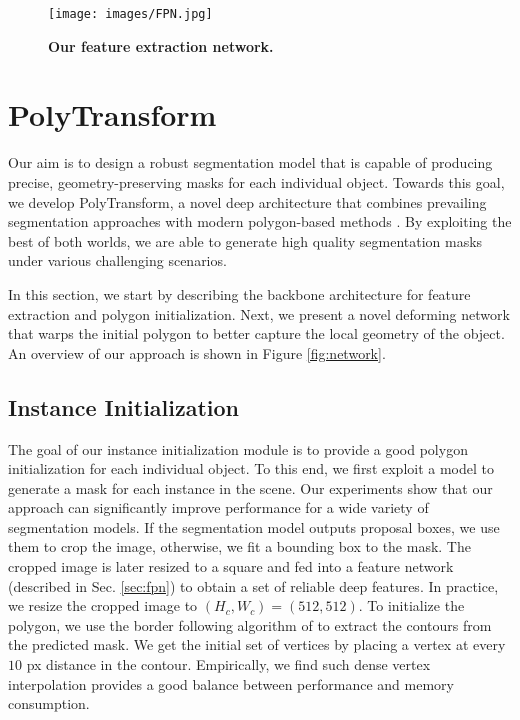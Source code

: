 \documentclass[10pt,twocolumn,letterpaper]{article}
\begin{document}
 



\begin{figure}[tb!]
\texttt{[image: images/FPN.jpg]}
\caption{\textbf{Our feature extraction network.}}
\vspace{-4mm}
\label{fig:fpn}
\end{figure}


\section{PolyTransform}
Our aim is to design a robust segmentation model that is capable of producing precise, geometry-preserving masks for each individual object. 
Towards this goal, we develop PolyTransform, a novel deep architecture that combines prevailing segmentation approaches \cite{mask-rcnn,upsnet} with modern polygon-based methods \cite{polygon-rnn,polygon-rnn++}. By exploiting the best of both worlds, we are able to generate high quality segmentation masks under various challenging scenarios.


In this section, we start by describing the backbone architecture for feature extraction and polygon initialization. 
Next, we present a novel deforming network that warps the initial polygon to better capture the local geometry of the object. An overview of our approach is shown in Figure \ref{fig:network}.






\subsection{Instance Initialization}
The goal of our instance initialization module is to provide a good polygon initialization for each individual object. To this end, we first exploit a  model to generate a mask for each instance in the scene. Our experiments show that our approach can significantly improve performance for a wide variety of segmentation models.  If the segmentation model outputs proposal boxes, we use them to crop the image, otherwise, we fit a bounding box to the mask. The cropped image is later resized to a square and fed into a feature network (described in Sec. \ref{sec:fpn})
to obtain a set of reliable deep features. In practice, we resize the cropped image to $(H_c, W_c) = (512, 512)$. To initialize the polygon, we use the border following algorithm of \cite{border-follow} to extract the contours from the predicted mask. We get the initial set of vertices by placing a vertex at every $10$ px distance in the contour. 
Empirically, we find such dense vertex interpolation provides a good balance between performance and memory consumption.
\end{document}
